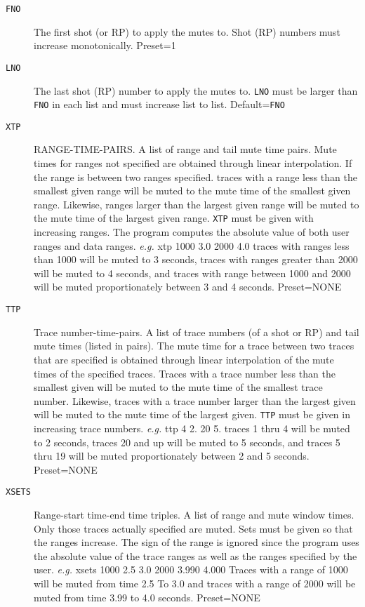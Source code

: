 \begin{description}
\item[\texttt{FNO}] The first \gls{shot} (or RP) to apply the mutes to.  Shot (RP)
         numbers must increase monotonically.
         Preset=1

\item[\texttt{LNO}] The last \gls{shot} (RP) number to apply the mutes to.  \texttt{LNO} must be
         larger than \texttt{FNO} in each list and must increase list to list.
         Default=\texttt{FNO}

\item[\texttt{XTP}] RANGE-TIME-PAIRS.  A list of range and tail mute time pairs.
         Mute times for ranges not specified are obtained through linear
         interpolation.  If the range is between two ranges specified.
         traces with a range less than the smallest given range will be
         muted to the mute time of the smallest given range.  Likewise,
         ranges larger than the largest given range will be muted to the
         mute time of the largest given range.  \texttt{XTP} must be given with
         increasing ranges. The program computes the absolute value of
         both user ranges and data ranges.  \textit{e.g.} xtp 1000 3.0 2000 4.0
         traces with ranges less than 1000 will be muted to 3 seconds,
         traces with ranges greater than 2000 will be muted to 4 seconds,
         and traces with range between 1000 and 2000 will be muted
         proportionately between 3 and 4 seconds.
         Preset=NONE

\item[\texttt{TTP}] Trace number-time-pairs.  A list of trace numbers (of a \gls{shot} or
         RP) and tail mute times (listed in pairs).  The mute time for a
         trace between two traces that are specified is obtained through
         linear interpolation of the mute times of the specified traces.
         Traces with a trace number less than the smallest given will be
         muted to the mute time of the smallest trace number.  Likewise,
         traces with a trace number larger than the largest given will
         be muted to the mute time of the largest given.  \texttt{TTP} must be
         given in increasing trace numbers. \textit{e.g.} ttp 4 2. 20 5.
         traces 1 thru 4 will be muted to 2 seconds, traces 20 and up
         will be muted to 5 seconds, and traces 5 thru 19 will be muted
         proportionately between 2 and 5 seconds.
         Preset=NONE

\item[\texttt{XSETS}] Range-start time-end time triples.  A list of range and mute
         window times.  Only those traces actually specified are muted.
         Sets must be given so that the ranges increase.  The sign of the
         range is ignored since the program uses the absolute value of
         the trace ranges as well as the ranges specified by the user.
         \textit{e.g.}  xsets 1000 2.5 3.0 2000 3.990 4.000
         Traces with a range of 1000 will be muted from time 2.5 To 3.0
         and traces with a range of 2000 will be muted from time 3.99 to
         4.0 seconds.
         Preset=NONE


\end{description}
